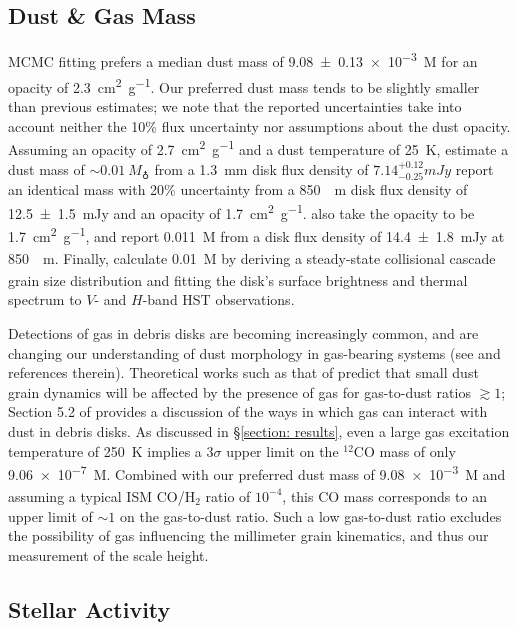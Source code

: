 \documentclass[modern]{aastex62}
\begin{document}
\subsection{Dust \& Gas Mass}
\label{subsection: dust mass}

MCMC fitting prefers a median dust mass of \SI{9.08 \pm 0.13e-3}{M_\earth} for an opacity of \SI{2.3}{cm^2.g^{-1}}.
Our preferred dust mass tends to be slightly smaller than previous estimates; we note that the reported uncertainties take into account neither the 10\% flux uncertainty nor assumptions about the dust opacity.
Assuming an opacity of \SI{2.7}{cm^2.g^{-1}} and a dust temperature of \SI{25}{K}, \citet{macgregor13} estimate a dust mass of $\sim \SI{0.01}{M_\earth}$ from a \SI{1.3}{mm} disk flux density of $7.14^{+0.12}_{-0.25} \si{mJy}$ 
\citet{matthews15} report an identical mass with 20\% uncertainty from a \SI{850}{\mu m} disk flux density of \SI{12.5 \pm 1.5}{mJy} and an opacity of \SI{1.7}{cm^2.g^{-1}}.
\citet{liu04} also take the opacity to be \SI{1.7}{cm^2.g^{-1}}, and report \SI{0.011}{M_\earth} from a disk flux density of \SI{14.4 \pm 1.8}{mJy} at \SI{850}{\mu m}.
Finally, \citet{strubbe&chiang06} calculate \SI{0.01}{M_\earth} by deriving a steady-state collisional cascade grain size distribution and fitting the disk's surface brightness and thermal spectrum to $V$- and $H$-band HST observations.

Detections of gas in debris disks are becoming increasingly common, and are changing our understanding of dust morphology in gas-bearing systems (see \citealp{hughes18} and references therein).
Theoretical works such as that of \citet{takeuchi&artymowcz01} predict that small dust grain dynamics will be affected by the presence of gas for gas-to-dust ratios $\gtrsim 1$; Section 5.2 of \citet{hughes17} provides a discussion of the ways in which gas can interact with dust in debris disks.
As discussed in \S \ref{section: results}, even a large gas excitation temperature of \SI{250}{K} implies a $3 \sigma$ upper limit on the $^{12}$CO mass of only \SI{9.06e-7}{M_\earth}. 
Combined with our preferred dust mass of \SI{9.08e-3}{M_\earth} and assuming a typical ISM CO/H$_2$ ratio of $10^{-4}$, this CO mass corresponds to an upper limit of $\sim 1$ on the gas-to-dust ratio.
Such a low gas-to-dust ratio excludes the possibility of gas influencing the millimeter grain kinematics, and thus our measurement of the scale height.

\subsection{Stellar Activity}
\label{subsection: stellar activity}
\end{document}
